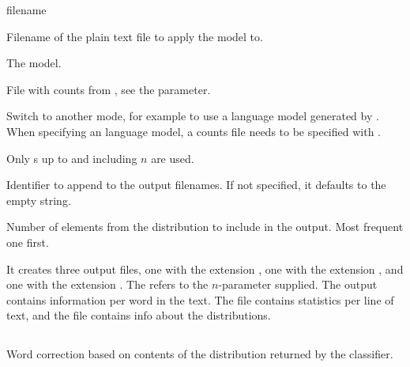 \documentclass[a4paper,10pt,twoside]{report}
\begin{document}
\begin{varlist}{filename}
\item[filename] Filename of the plain text file to apply the model to.
\item[ngl] The \ngram{} model.
\item[ngc] File with counts from \srilm{}, see the 
  parameter.
\item[mode] Switch to another mode, for example  to
  use a language model generated by \srilm{}. When specifying an
  \srilm{} language model, a counts file needs to be specified with
  . 
\item[n] Only \ngram{}s up to and including $n$ are used.
\item[id] Identifier to append to the output filenames. If not
  specified, it defaults to the empty string.
\item[topn] Number of elements from the distribution to
  include in the output. Most frequent one first.
\end{varlist}

It creates three output files, one with the extension , one
with the extension , and one with the extension
. The  refers to the $n$-parameter supplied. The
 output contains information per word in the text. The
 file contains statistics per line of text, and the
 file contains info about the distributions.

\subsection{}

Word correction based on contents of the distribution returned by the
classifier.
\end{document}
